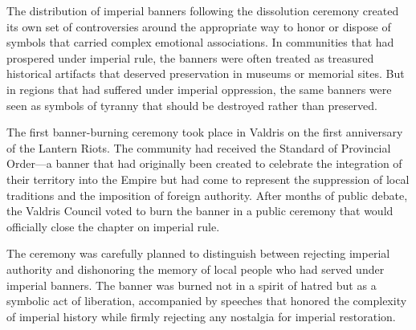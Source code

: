 The distribution of imperial banners following the dissolution ceremony
created its own set of controversies around the appropriate way to honor
or dispose of symbols that carried complex emotional associations. In
communities that had prospered under imperial rule, the banners were
often treated as treasured historical artifacts that deserved
preservation in museums or memorial sites. But in regions that had
suffered under imperial oppression, the same banners were seen as
symbols of tyranny that should be destroyed rather than preserved.

The first banner-burning ceremony took place in Valdris on the first
anniversary of the Lantern Riots. The community had received the
Standard of Provincial Order---a banner that had originally been created
to celebrate the integration of their territory into the Empire but had
come to represent the suppression of local traditions and the imposition
of foreign authority. After months of public debate, the Valdris Council
voted to burn the banner in a public ceremony that would officially
close the chapter on imperial rule.

The ceremony was carefully planned to distinguish between rejecting
imperial authority and dishonoring the memory of local people who had
served under imperial banners. The banner was burned not in a spirit of
hatred but as a symbolic act of liberation, accompanied by speeches that
honored the complexity of imperial history while firmly rejecting any
nostalgia for imperial restoration.

